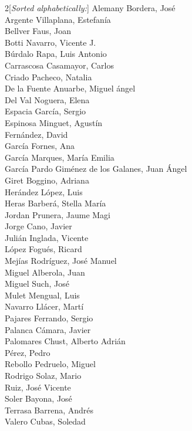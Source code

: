 
\begin{multicols}{2}[\textit{Sorted alphabetically:}]
\small{
Alemany Bordera, 	Jos\'{e} \\
Argente Villaplana, 	Estefan\'{i}a \\
Bellver Faus,	Joan \\
Botti Navarro, 	Vicente J. \\
B\'{u}rdalo Rapa, 	Luis Antonio \\
Carrascosa Casamayor,	Carlos \\
Criado Pacheco, 	Natalia \\
De la Fuente Anuarbe, 	Miguel \'{a}ngel \\
Del Val Noguera,	Elena \\
Espacia Garc\'{i}a, 	Sergio \\
Espinosa Minguet, 	Agust\'{i}n \\
Fern\'{a}ndez,	David \\
Garc\'{i}a Fornes, 	Ana \\
Garc\'{i}a Marques, 	Mar\'{i}a Emilia \\
Garc\'{i}a Pardo Gim\'{e}nez de los Galanes,	Juan \'{A}ngel \\
Giret Boggino, 	Adriana \\
Her\'{a}ndez L\'{o}pez,	Luis \\
Heras Barber\'{a},	Stella Mar\'{i}a \\
Jordan Prunera,	Jaume Magi \\
Jorge Cano,	Javier \\
Juli\'{a}n Inglada,	Vicente \\
L\'{o}pez Fogu\'{e}s, 	Ricard \\
Mej\'{i}as Rodr\'{i}guez, 	Jos\'{e} Manuel \\
Miguel Alberola,	Juan \\
Miguel Such, 	Jos\'{e} \\
Mulet Mengual, 	Luis \\
Navarro Ll\'{a}cer, 	Mart\'{i} \\
Pajares Ferrando, 	Sergio \\
Palanca C\'{a}mara,	Javier \\
Palomares Chust,	Alberto Adri\'{a}n \\
P\'{e}rez,	Pedro \\
Rebollo Pedruelo,	Miguel \\
Rodrigo Solaz, 	Mario \\
Ruiz,	Jos\'{e} Vicente \\
Soler Bayona, 	Jos\'{e} \\
Terrasa Barrena,	Andr\'{e}s \\
Valero Cubas,	Soledad \\
}
\end{multicols}
